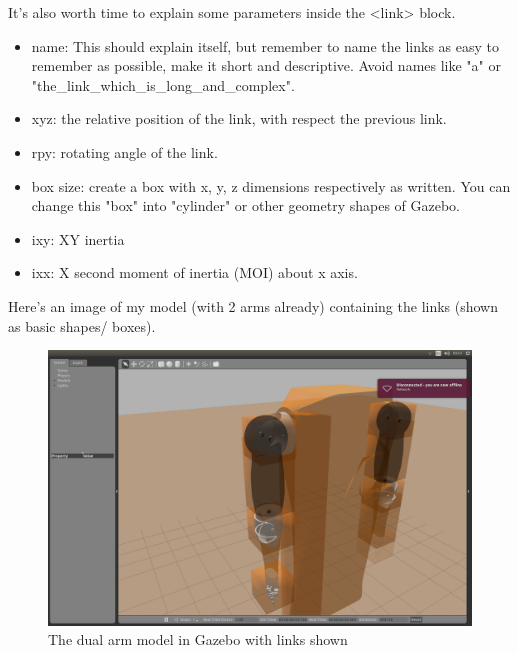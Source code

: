 \documentclass[pdftex,12pt,a4paper]{article}
\begin{document}
  \newpage
  It's also worth time to explain some parameters inside the <link> block.
  \begin{itemize}
  \item name: This should explain itself, but remember to name the links as easy to remember as possible, make it short and descriptive. Avoid names like "a" or "the\_link\_which\_is\_long\_and\_complex".
  \item xyz: the relative position of the link, with respect the previous link.
  \item rpy: rotating angle of the link.
  \item box size: create a box with x, y, z dimensions respectively as written. You can change this "box" into "cylinder" or other geometry shapes of Gazebo.
  \item ixy: XY inertia
  \item ixx: X second moment of inertia (MOI) about x axis.
  \end{itemize}
  Here's an image of my model (with 2 arms already) containing the links (shown as basic shapes/ boxes).
  \begin{figure}[h]
      \centering
      \includegraphics[width=0.8\linewidth]{image/arm_gazebo_links.png}
      \caption{The dual arm model in Gazebo with links shown}
      \label{fig:arm_gazebo_link}
  \end{figure}
  
\end{document}

